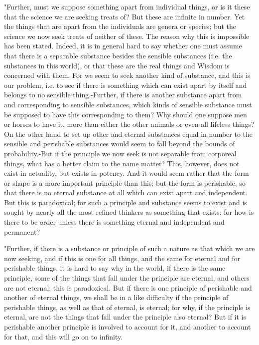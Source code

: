 "Further, must we suppose something apart from individual things,
or is it these that the science we are seeking treats of? But these
are infinite in number. Yet the things that are apart from the individuals
are genera or species; but the science we now seek treats of neither
of these. The reason why this is impossible has been stated. Indeed,
it is in general hard to say whether one must assume that there is
a separable substance besides the sensible substances (i.e. the substances
in this world), or that these are the real things and Wisdom is concerned
with them. For we seem to seek another kind of substance, and this
is our problem, i.e. to see if there is something which can exist
apart by itself and belongs to no sensible thing.-Further, if there
is another substance apart from and corresponding to sensible substances,
which kinds of sensible substance must be supposed to have this corresponding
to them? Why should one suppose men or horses to have it, more than
either the other animals or even all lifeless things? On the other
hand to set up other and eternal substances equal in number to the
sensible and perishable substances would seem to fall beyond the bounds
of probability.-But if the principle we now seek is not separable
from corporeal things, what has a better claim to the name matter?
This, however, does not exist in actuality, but exists in potency.
And it would seem rather that the form or shape is a more important
principle than this; but the form is perishable, so that there is
no eternal substance at all which can exist apart and independent.
But this is paradoxical; for such a principle and substance seems
to exist and is sought by nearly all the most refined thinkers as
something that exists; for how is there to be order unless there is
something eternal and independent and permanent? 

"Further, if there is a substance or principle of such a nature as
that which we are now seeking, and if this is one for all things,
and the same for eternal and for perishable things, it is hard to
say why in the world, if there is the same principle, some of the
things that fall under the principle are eternal, and others are not
eternal; this is paradoxical. But if there is one principle of perishable
and another of eternal things, we shall be in a like difficulty if
the principle of perishable things, as well as that of eternal, is
eternal; for why, if the principle is eternal, are not the things
that fall under the principle also eternal? But if it is perishable
another principle is involved to account for it, and another to account
for that, and this will go on to infinity. 

